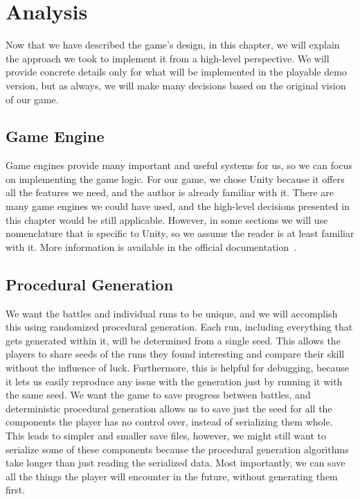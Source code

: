 \chapter{Analysis}

Now that we have described the game's design, in this chapter, we will explain the approach we took to implement it from a high-level perspective.
We will provide concrete details only for what will be implemented in the playable demo version, but as always, we will make many decisions based on the original vision of our game.

\section{Game Engine}

Game engines provide many important and useful systems for us, so we can focus on implementing the game logic.
For our game, we chose Unity because it offers all the features we need, and the author is already familiar with it.
There are many game engines we could have used, and the high-level decisions presented in this chapter would be still applicable.
However, in some sections we will use nomenclature that is specific to Unity, so we assume the reader is at least familiar with it.
More information is available in the official documentation~\cite{UnityDocs}.

\section{Procedural Generation}

We want the battles and individual runs to be unique, and we will accomplish this using randomized procedural generation.
Each run, including everything that gets generated within it, will be determined from a single seed.
This allows the players to share seeds of the runs they found interesting and compare their skill without the influence of luck.
Furthermore, this is helpful for debugging, because it lets us easily reproduce any issue with the generation just by running it with the same seed.
We want the game to save progress between battles, and deterministic procedural generation allows us to save just the seed for all the components the player has no control over, instead of serializing them whole.
This leads to simpler and smaller save files, however, we might still want to serialize some of these components because the procedural generation algorithms take longer than just reading the serialized data.
Most importantly, we can save all the things the player will encounter in the future, without generating them first.

